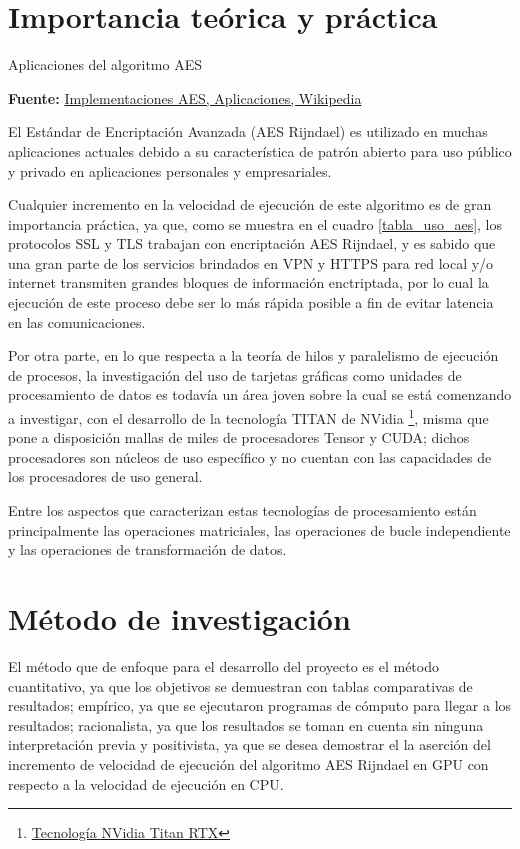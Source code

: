 \documentclass[../main/main.tex]{subfiles}
\begin{document}
  \section{Importancia teórica y práctica}

  \begin{table}[H]
    \centering
    \caption{Aplicaciones del algoritmo AES}
    
    \caption*{\textbf{Fuente:} \href{https://en.wikipedia.org/wiki/AES_implementations}{Implementaciones AES, Aplicaciones, Wikipedia}}
    \label{tabla_uso_aes}
  \end{table}

  El Estándar de Encriptación Avanzada (AES Rijndael) es utilizado en muchas aplicaciones actuales debido a su característica de patrón abierto para uso público y privado en aplicaciones personales y empresariales.

  Cualquier incremento en la velocidad de ejecución de este algoritmo es de gran importancia práctica, ya que, como se muestra en el cuadro \ref{tabla_uso_aes}, los protocolos SSL y TLS trabajan con encriptación AES Rijndael, y es sabido que una gran parte de los servicios brindados en VPN y HTTPS para red local y/o internet transmiten grandes bloques de información enctriptada, por lo cual la ejecución de este proceso debe ser lo más rápida posible a fin de evitar latencia en las comunicaciones.

  Por otra parte, en lo que respecta a la teoría de hilos y paralelismo de ejecución de procesos, la investigación del uso de tarjetas gráficas como unidades de procesamiento de datos es todavía un área joven sobre la cual se está comenzando a investigar, con el desarrollo de la tecnología TITAN de NVidia \footnote{\href{https://www.nvidia.com/en-us/titan/titan-rtx/}{Tecnología NVidia Titan RTX}}, misma que pone a disposición mallas de miles de procesadores Tensor y CUDA; dichos procesadores son núcleos de uso específico y no cuentan con las capacidades de los procesadores de uso general.

  Entre los aspectos que caracterizan estas tecnologías de procesamiento están principalmente las operaciones matriciales, las operaciones de bucle independiente y las operaciones de transformación de datos.

  \section{Método de investigación}

  El método que de enfoque para el desarrollo del proyecto es el método cuantitativo, ya que los objetivos se demuestran con tablas comparativas de resultados; empírico, ya que se ejecutaron programas de cómputo para llegar a los resultados; racionalista, ya que los resultados se toman en cuenta sin ninguna interpretación previa y positivista, ya que se desea demostrar el la aserción del incremento de velocidad de ejecución del algoritmo AES Rijndael en GPU con respecto a la velocidad de ejecución en CPU.
\end{document}
